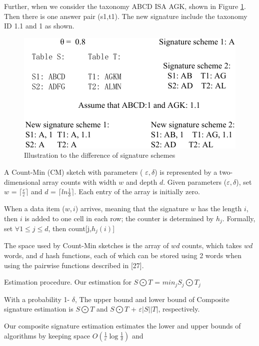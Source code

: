 Further, when we consider the taxonomy ABCD ISA AGK, shown in Figure \ref{fig:signature_example1}. Then there is one answer pair (s1,t1). The new signature include the taxonomy ID 1.1 and 1  as shown.

\begin{figure}[h]
\centering
\includegraphics[scale=0.8]{figures/signature_example1}
 \caption{Illustration to the difference of signature schemes}
\label{fig:signature_example1}
\end{figure}

A Count-Min (CM) sketch with parameters ( $\varepsilon, \delta$) is represented by a two-dimensional
array counts with width $w$ and depth $d$. Given parameters ($\varepsilon, \delta$), set
$w$ = $\lceil \frac{e}{\varepsilon} \rceil$ and $d$ = $\lceil ln \frac{1}{\delta} \rceil $. Each entry of the array is initially zero.


When a data item ($w,i$) arrives, meaning that the signature $w$ has the length $i$, then $i$ is added to one cell in each row; the counter is determined by $h_j$. Formally, set $\forall 1 \leq j \leq d$, then count[j,$h_j(i)$]


The space used by Count-Min sketches is the array of $wd$ counts, which takes $wd$ words, and $d$ hash
functions, each of which can be stored using 2 words when using the pairwise functions described in [27].

Estimation procedure. Our estimation for $S \bigodot T $ = $min_j S_j \bigodot T_j $


\begin{theorem}
With a probability 1- $\delta$, The upper bound and lower bound of Composite signature estimation is
 $S \bigodot T $ and  $S \bigodot T $ + $\varepsilon |S| |T|$, respectively.
\end{theorem}

\begin{theorem}
Our composite signature estimation estimates the lower and upper bounds of algorithms by keeping space $O(\frac{1}{\varepsilon} \log \frac{1}{\delta})$ and
\end{theorem}

